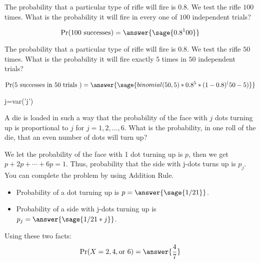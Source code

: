 \documentclass{ximera}
\begin{document}
\hspace{1cm}

\begin{problem}
The probability that a particular type of rifle will fire is $0.8$. We test the rifle $100$ times.
What is the probability it will fire in every one of $100$ independent trials? 

\begin{prompt}
\begin{equation*} 
\Pr(100 \text{ successes} ) = \answer{\sage{0.8^100}}
\end{equation*}
\end{prompt}
\end{problem}


\begin{problem}
The probability that a particular type of rifle will fire is $0.8$. We test the rifle $50$ times.
What is the probability it will fire exactly $5$ times in $50$ independent trials? 

\begin{explanation}
\begin{equation*} 
\Pr(5 \text{ successes in  } 50 \text{ trials } ) = \answer{\sage{binomial(50,5)*0.8^5*(1-0.8)^(50-5)}} 
\end{equation*}
\end{explanation}
\end{problem}



\begin{problem}
\begin{sagesilent}
j=var('j')
\end{sagesilent}
A die is loaded in such a way that the probability of the face with $j$ dots turning up is proportional to $j$ for $j = 1,2, \ldots,6$. What is the probability, in one roll of the die, that an even number of dots will turn up? 
\begin{hint}
We let the probability of the face with 1 dot turning up is $p$,
then we get $p+2p+\cdots+6p=1$.
Thus, probability that the side with j-dots turns up is $p_j$.
You can complete the problem by using Addition Rule.
\end{hint}

\begin{prompt}
\begin{itemize}
    \item Probability of a dot turning up is $p=\answer{\sage{1/21}}$.
    \item Probability of a side with j-dots turning up is $p_j =\answer{\sage{1/21*j}}$.
\end{itemize}
Using these two facts:
\begin{equation*}
\Pr(X=2, 4, \text{or } 6 ) =%
\answer{\frac{4}{7}}
\end{equation*}

\end{prompt}
\end{problem}
\end{document}
